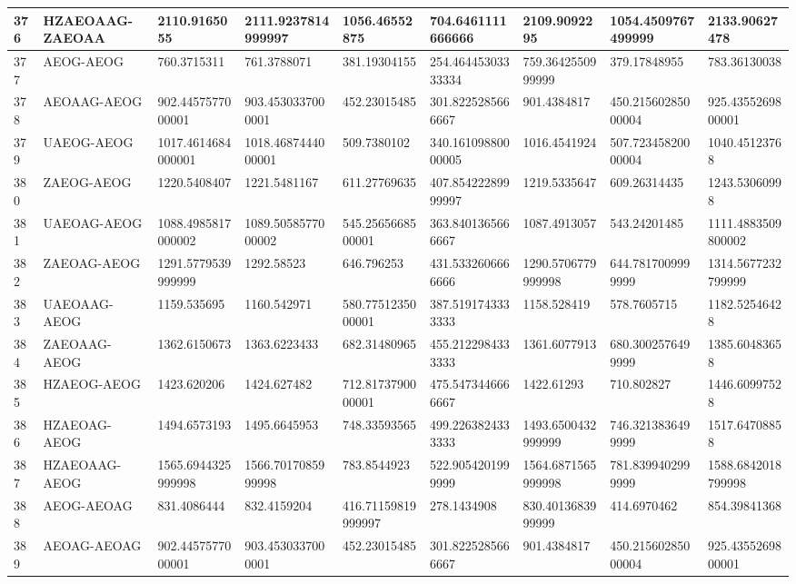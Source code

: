 {\begin{longtable}{|l|l|l|l|l|l|l|l|l|}
        376 & HZAEOAAG-ZAEOAA & 2110.9165055 & 2111.9237814999997 & 1056.46552875 & 704.6461111666666 & 2109.9092295 & 1054.4509767499999 & 2133.90627478 \\ \hline
        377 & AEOG-AEOG & 760.3715311 & 761.3788071 & 381.19304155 & 254.46445303333334 & 759.3642550999999 & 379.17848955 & 783.36130038 \\ \hline
        378 & AEOAAG-AEOG & 902.4457577000001 & 903.4530337000001 & 452.23015485 & 301.8225285666667 & 901.4384817 & 450.21560285000004 & 925.4355269800001 \\ \hline
        379 & UAEOG-AEOG & 1017.4614684000001 & 1018.4687444000001 & 509.7380102 & 340.16109880000005 & 1016.4541924 & 507.72345820000004 & 1040.45123768 \\ \hline
        380 & ZAEOG-AEOG & 1220.5408407 & 1221.5481167 & 611.27769635 & 407.85422289999997 & 1219.5335647 & 609.26314435 & 1243.53060998 \\ \hline
        381 & UAEOAG-AEOG & 1088.4985817000002 & 1089.5058577000002 & 545.2565668500001 & 363.8401365666667 & 1087.4913057 & 543.24201485 & 1111.4883509800002 \\ \hline
        382 & ZAEOAG-AEOG & 1291.5779539999999 & 1292.58523 & 646.796253 & 431.5332606666666 & 1290.5706779999998 & 644.7817009999999 & 1314.5677232799999 \\ \hline
        383 & UAEOAAG-AEOG & 1159.535695 & 1160.542971 & 580.7751235000001 & 387.5191743333333 & 1158.528419 & 578.7605715 & 1182.52546428 \\ \hline
        384 & ZAEOAAG-AEOG & 1362.6150673 & 1363.6223433 & 682.31480965 & 455.2122984333333 & 1361.6077913 & 680.3002576499999 & 1385.60483658 \\ \hline
        385 & HZAEOG-AEOG & 1423.620206 & 1424.627482 & 712.8173790000001 & 475.5473446666667 & 1422.61293 & 710.802827 & 1446.60997528 \\ \hline
        386 & HZAEOAG-AEOG & 1494.6573193 & 1495.6645953 & 748.33593565 & 499.2263824333333 & 1493.6500432999999 & 746.3213836499999 & 1517.64708858 \\ \hline
        387 & HZAEOAAG-AEOG & 1565.6944325999998 & 1566.7017085999998 & 783.8544923 & 522.9054201999999 & 1564.6871565999998 & 781.8399402999999 & 1588.6842018799998 \\ \hline
        388 & AEOG-AEOAG & 831.4086444 & 832.4159204 & 416.71159819999997 & 278.1434908 & 830.4013683999999 & 414.6970462 & 854.39841368 \\ \hline
        389 & AEOAG-AEOAG & 902.4457577000001 & 903.4530337000001 & 452.23015485 & 301.8225285666667 & 901.4384817 & 450.21560285000004 & 925.4355269800001 \\ \hline

\end{longtable}}
